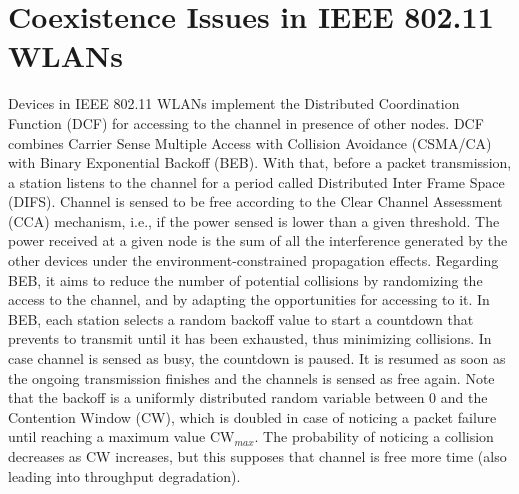 \documentclass[12pt, a4paper,twoside]{tesi_upf}
\begin{document}
		\section{Coexistence Issues in IEEE 802.11 WLANs}
		\label{section:coexistence_issues}	
			Devices in IEEE 802.11 WLANs implement the Distributed Coordination Function (DCF) for accessing to the channel in presence of other nodes. DCF combines Carrier Sense Multiple Access with Collision Avoidance (CSMA/CA) with Binary Exponential Backoff (BEB). With that, before a packet transmission, a station listens to the channel for a period called Distributed Inter Frame Space (DIFS). Channel is sensed to be free according to the Clear Channel Assessment (CCA) mechanism, i.e., if the power sensed is lower than a given threshold. The power received at a given node is the sum of all the interference generated by the other devices under the environment-constrained propagation effects. Regarding BEB, it aims to reduce the number of potential collisions by randomizing the access to the channel, and by adapting the opportunities for accessing to it. In BEB, each station selects a random backoff value to start a countdown that prevents to transmit until it has been exhausted, thus minimizing collisions. In case channel is sensed as busy, the countdown is paused. It is resumed as soon as the ongoing transmission finishes and the channels is sensed as free again. Note that the backoff is a uniformly distributed random variable between 0 and the Contention Window (CW), which is doubled in case of noticing a packet failure until reaching a maximum value $\text{CW}_{max}$. The probability of noticing a collision decreases as CW increases, but this supposes that channel is free more time (also leading into throughput degradation).
					
\end{document}
